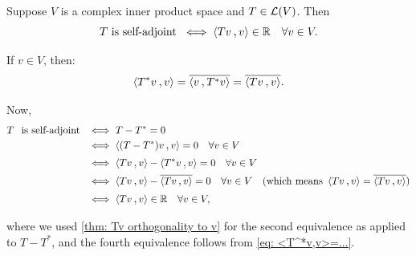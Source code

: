\begin{thm}
  \label{thm: condition for T s. t. <Tv><v> is always real}
  Suppose $V$ is a complex inner product space and $T \in \mathcal{L}(V)$. Then
  \[
    T \text{ is self-adjoint } \iff \ip{Tv}{v} \in \real \quad \forall v \in V.
  \]
\end{thm}
\begin{prf}
  If $v \in V$, then:
  \begin{equation}
    \label{eq: <T^*v,v>=...}
    \ip{T^*v}{v} = \overline{\ip{v}{T^*v}}=\overline{\ip{Tv}{v}}.
  \end{equation}

  Now,
  \begin{equation}
    \begin{aligned}
      T \mytext{is self-adjoint}
      & \iff T-T^* = 0 \\
      & \iff \ip{(T-T^*)v}{v}=0 \quad \forall v \in V  \\
      & \iff \ip{Tv}{v} - \ip{T^*v}{v} = 0 \quad \forall v \in V  \\
      & \iff \ip{Tv}{v} - \overline{\ip{Tv}{v}} = 0 \quad \forall v  \in V \quad (\text{which means } \ip{Tv}{v} = \overline {\ip{Tv}{v}}) \\
      & \iff \ip{Tv}{v} \in \real \quad \forall v \in V,  \\
    \end{aligned}
  \end{equation}

  where we used \ref{thm: Tv orthogonality to v} for the second equivalence as applied to $T-T^*$, and the fourth equivalence follows from \eqref{eq: <T^*v,v>=...}.
\end{prf}

